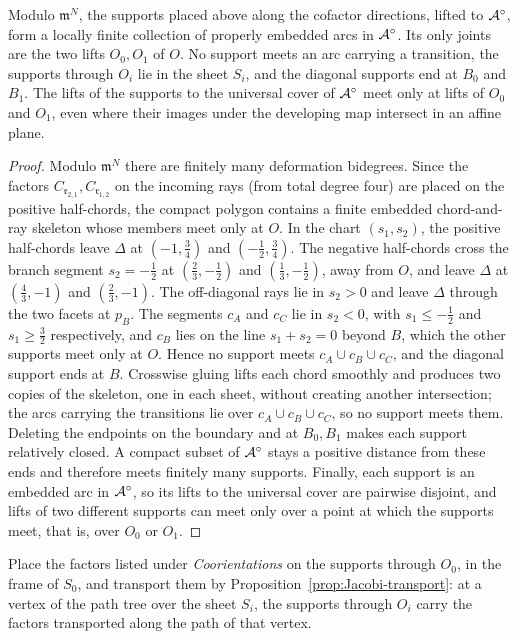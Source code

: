 \begin{proposition}\label{prop:proper-supports}
Modulo $\mathfrak m^N$, the supports placed above along the cofactor
directions, lifted to $\mathcal A^\circ$, form a locally finite collection of
properly embedded arcs in $\mathcal A^\circ$.  Its only joints are the two lifts
$O_0,O_1$ of $O$.  No support meets an arc carrying a transition, the
supports through $O_i$ lie in the sheet $S_i$, and the diagonal supports end at $B_0$
and $B_1$.  The lifts of the supports to the universal cover of
$\mathcal A^\circ$ meet only at lifts of $O_0$ and $O_1$, even where their
images under the developing map intersect in an affine plane.
\end{proposition}

\begin{proof}
Modulo $\mathfrak m^N$ there are finitely many deformation bidegrees.  Since the
factors $C_{\mathfrak r_{2,1}},C_{\mathfrak r_{1,2}}$ on the incoming rays
(from total degree four) are placed on the positive half-chords, the compact
polygon contains a finite embedded chord-and-ray skeleton whose members meet
only at $O$.  In the chart $(s_1,s_2)$, the positive half-chords leave
$\Delta$ at $(-1,\frac34)$ and $(-\frac12,\frac34)$.  The negative
half-chords cross the branch segment $s_2=-\frac12$ at $(\frac23,-\frac12)$ and $(\frac13,-\frac12)$, away from
$O$, and leave $\Delta$ at $(\frac43,-1)$ and $(\frac23,-1)$.  The
off-diagonal rays lie in $s_2>0$ and leave $\Delta$ through the two facets
at $p_B$.  The segments $c_A$ and $c_C$ lie in $s_2<0$, with $s_1\leq-\frac12$
and $s_1\geq\frac32$ respectively, and $c_B$ lies on the line $s_1+s_2=0$
beyond $B$, which the other supports meet only at $O$.  Hence no support
meets $c_A\cup c_B\cup c_C$, and the diagonal support ends at $B$.  Crosswise
gluing lifts each chord smoothly and produces two copies of the skeleton, one
in each sheet, without creating another intersection; the arcs carrying the
transitions lie over $c_A\cup c_B\cup c_C$, so no support meets them.
Deleting the endpoints on the boundary and at $B_0,B_1$ makes each support
relatively closed.  A compact subset of $\mathcal A^\circ$ stays a positive distance from
these ends and therefore meets finitely many supports.  Finally, each
support is an embedded arc in $\mathcal A^\circ$, so its lifts to the universal
cover are pairwise disjoint, and lifts of two different supports can meet
only over a point at which the supports meet, that is, over $O_0$ or $O_1$.
\end{proof}

Place the factors listed under \emph{Coorientations} on the
supports through $O_0$, in the frame of $S_0$, and transport them by
Proposition~\ref{prop:Jacobi-transport}: at a vertex of the path tree over
the sheet $S_i$, the supports through $O_i$ carry the factors transported
along the path of that vertex.

